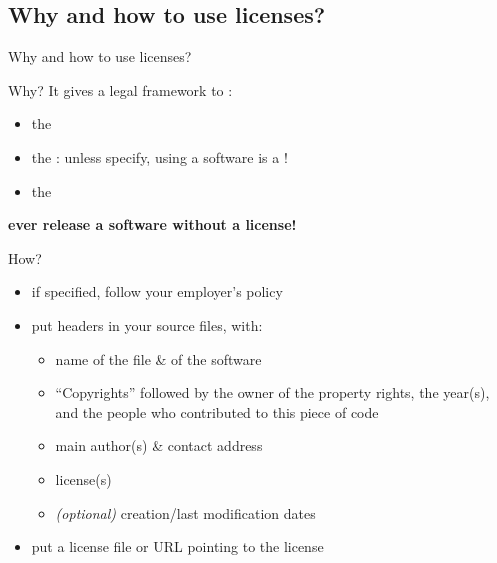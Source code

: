 \documentclass[10pt,xcolor=svgnames]{beamer}
\begin{document}
\subsection{Why and how to use licenses?}
\begin{frame}{Why and how to use licenses?}

  \vspace{-.5em}
  \begin{block}{Why?}
    It gives a legal framework to :
    \begin{itemize}
      \item the 
      \item the : unless specify, using a software is a !
      \item the 
    \end{itemize}
  \end{block}

  \vspace{-.5em}
  \begin{alertblock}{}
    \begin{center} {\bfseries ever release a software without a license!}\end{center}
  \end{alertblock}
  \vspace{-.5em}

  \begin{block}{How?}
    \begin{itemize}
      \item if specified, follow your employer's policy
      \item put headers in your source files, with:
        \begin{itemize}
          \item name of the file \& of the software
          \item ``Copyrights'' followed by the owner of the property rights, the year(s), and the people who contributed to this piece of code
          \item main author(s) \& contact address
          \item license(s)
          \item \emph{(optional)} creation/last modification dates
        \end{itemize}
      \item put a license file or URL pointing to the license
    \end{itemize}
  \end{block}

\end{frame}
\end{document}
